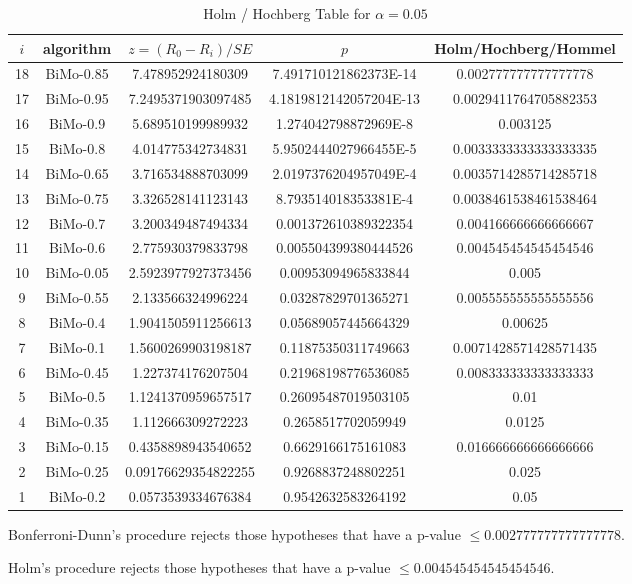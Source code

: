 \documentclass[a4paper,10pt]{article}
\begin{document}
\begin{landscape}
\begin{table}[!htp]
\centering\tiny
\caption{Holm / Hochberg Table for $\alpha=0.05$}
\begin{tabular}{ccccc}
$i$&algorithm&$z=(R_0 - R_i)/SE$&$p$&Holm/Hochberg/Hommel\\
\hline
18&BiMo-0.85&7.478952924180309&7.491710121862373E-14&0.002777777777777778\\
17&BiMo-0.95&7.2495371903097485&4.1819812142057204E-13&0.0029411764705882353\\
16&BiMo-0.9&5.689510199989932&1.274042798872969E-8&0.003125\\
15&BiMo-0.8&4.014775342734831&5.9502444027966455E-5&0.0033333333333333335\\
14&BiMo-0.65&3.716534888703099&2.0197376204957049E-4&0.0035714285714285718\\
13&BiMo-0.75&3.326528141123143&8.793514018353381E-4&0.0038461538461538464\\
12&BiMo-0.7&3.200349487494334&0.001372610389322354&0.004166666666666667\\
11&BiMo-0.6&2.775930379833798&0.005504399380444526&0.004545454545454546\\
10&BiMo-0.05&2.5923977927373456&0.00953094965833844&0.005\\
9&BiMo-0.55&2.133566324996224&0.03287829701365271&0.005555555555555556\\
8&BiMo-0.4&1.9041505911256613&0.05689057445664329&0.00625\\
7&BiMo-0.1&1.5600269903198187&0.11875350311749663&0.0071428571428571435\\
6&BiMo-0.45&1.227374176207504&0.21968198776536085&0.008333333333333333\\
5&BiMo-0.5&1.1241370959657517&0.26095487019503105&0.01\\
4&BiMo-0.35&1.112666309272223&0.2658517702059949&0.0125\\
3&BiMo-0.15&0.4358898943540652&0.6629166175161083&0.016666666666666666\\
2&BiMo-0.25&0.09176629354822255&0.9268837248802251&0.025\\
1&BiMo-0.2&0.0573539334676384&0.9542632583264192&0.05\\
\hline
\end{tabular}
\end{table}
Bonferroni-Dunn's procedure rejects those hypotheses that have a p-value $\le0.002777777777777778$.


Holm's procedure rejects those hypotheses that have a p-value $\le0.004545454545454546$.



\end{landscape}
\end{document}
